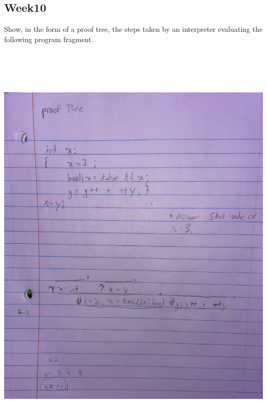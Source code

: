 \documentclass{article}
\theoremstyle{theorem}
\theoremstyle{definition}
\theoremstyle{remark}
\begin{document}
\subsection{Week10}
Show, in the form of a proof tree, the steps taken by an interpreter evaluating the following program fragment.
\medskip\begin{center}
\includegraphics[width=15cm, height=20cm]{Week10.pdf}
\end{center}
\clearpage
\end{document}
